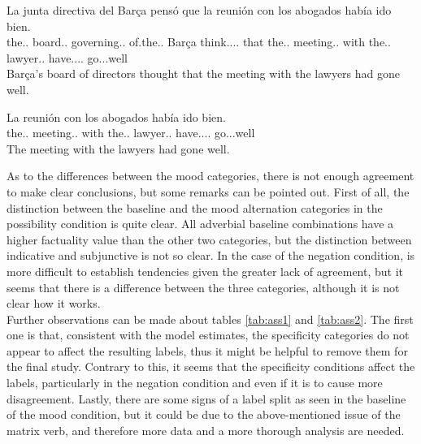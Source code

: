 \begin{exe}
  \ex\label{ex:think}
   \begin{xlist}
    \item{\gll La junta directiva del Barça pensó que la reunión con los abogados había ido bien.\\ the.\F.\Sg{} board.\F.\Sg{} governing.\F.\Sg{} of.the.\M.\Sg{} Barça think.\Pst.\Pfv.\Ind.\Tsg{} that the.\F.\Sg{} meeting.\F.\Sg{} with the.\M.\Pl{} lawyer.\M.\Pl{} have.\Pst.\Ipfv.\Ind.\Tsg{} go.\Ptcp.\M.\Sg{}well \\\glt Barça's board of directors thought that the meeting with the lawyers had gone well.}
      \item{\gll La reunión con los abogados había ido bien.\\ the.\F.\Sg{} meeting.\F.\Sg{} with the.\M.\Pl{} lawyer.\M.\Pl{} have.\Pst.\Ipfv.\Ind.\Tsg{} go.\Ptcp.\M.\Sg{}well \\\glt The meeting with the lawyers had gone well.}\label{ex:hyp2}
    \end{xlist}
\end{exe}

As to the differences between the mood categories, there is not enough agreement to make clear conclusions, but some remarks can be pointed out. First of all, the distinction between the baseline and the mood alternation categories in the possibility condition is quite clear. All adverbial baseline combinations have a higher factuality value than the other two categories, but the distinction between indicative and subjunctive is not so clear. In the case of the negation condition, is more difficult to establish tendencies given the greater lack of agreement, but it seems that there is a difference between the three categories, although it is not clear how it works.\\ 

Further observations can be made about tables \ref{tab:ass1} and \ref{tab:ass2}. The first one is that, consistent with the model estimates, the specificity categories do not appear to affect the resulting labels, thus it might be helpful to remove them for the final study. Contrary to this, it seems that the specificity conditions affect the labels, particularly in the negation condition and even if it is to cause more disagreement. Lastly, there are some signs of a label split as seen in the baseline of the mood condition, but it could be due to the above-mentioned issue of the matrix verb, and therefore more data and a more thorough analysis are needed.\\ 

